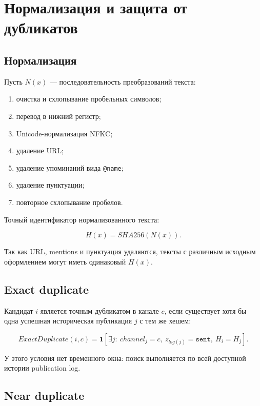 \documentclass[12pt,a4paper]{article}
\newcommand{\Ind}{\mathbf{1}}
\newcommand{\Status}[1]{\texttt{#1}}
\begin{document}
\section{Нормализация и защита от дубликатов}

\subsection{Нормализация}

Пусть $N(x)$ --- последовательность преобразований текста:

\begin{enumerate}
  \item очистка и схлопывание пробельных символов;
  \item перевод в нижний регистр;
  \item Unicode-нормализация NFKC;
  \item удаление URL;
  \item удаление упоминаний вида \texttt{@name};
  \item удаление пунктуации;
  \item повторное схлопывание пробелов.
\end{enumerate}

Точный идентификатор нормализованного текста:

\begin{equation}
  H(x)=SHA256(N(x)).
  \label{eq:text-hash}
\end{equation}

Так как URL, mentions и пунктуация удаляются, тексты с различным исходным
оформлением могут иметь одинаковый $H(x)$.

\subsection{Exact duplicate}

Кандидат $i$ является точным дубликатом в канале $c$, если существует хотя бы
одна успешная историческая публикация $j$ с тем же хешем:

\begin{equation}
  ExactDuplicate(i,c)=
  \Ind\!\left[
    \exists j:\ channel_j=c,\ z_{log(j)}=\Status{sent},\ H_i=H_j
  \right].
  \label{eq:exact-duplicate}
\end{equation}

У этого условия нет временного окна: поиск выполняется по всей доступной
истории publication log.

\subsection{Near duplicate}
\end{document}
